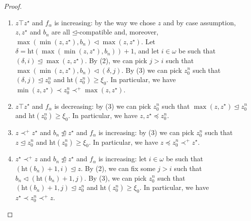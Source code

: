 \documentclass[12pt]{amsart}
\theoremstyle{definition}
\theoremstyle{remark}
\begin{document}
\begin{proof}

\begin{enumerate}[label={(\roman*)}]
\itemsep0.3em
\item $z \top z^\star$ and $f_\alpha$ is increasing:
\newline by the way we chose $z$ and by case assumption, $z,z^\star$ and $b_n$ are all $\unlhd$-compatible and, moreover, $\max(\min(z,z^\star), b_n) \lhd \max(z,z^\star)$. Let $\delta = \mathrm{ht}(\max(\min(z, z^\star), b_n))+1$, and let $i \in \omega$ be such that $(\delta, i) \unlhd \max(z, z^\star)$. By (2), we can pick $j > i$ such that $\max(\min(z, z^\star), b_n) \lhd (\delta, j)$. By (3) we can pick $z_0^n$ such that $(\delta, j) \unlhd z_0^n$ and $\mathrm{ht}(z_0^n) \ge \xi_0$. In particular, we have $\min(z,z^\star) \prec z_0^n \prec^+ \max(z, z^\star)$. 

\item $z \top z^\star$ and $f_\alpha$ is decreasing:
\newline by (3) we can pick $z_0^n$ such that $\max (z,z^\star) \unlhd z_0^n$ and $\mathrm{ht}(z_0^n) \ge \xi_0$. In particular, we have $z,z^\star \preceq z_0^n$.

\item $z \prec^+ z^\star$ and $b_n \not\trianglelefteq z^\star$ and $f_\alpha$ is increasing:
\newline by (3) we can pick $z_0^n$ such that $z \unlhd z_0^n$ and $\mathrm{ht}(z_0^n) \ge \xi_0$. In particular, we have $z \preceq z_0^n \prec^+ z^\star$.


\item $z^\star \prec^+ z$ and $b_n \not\trianglelefteq z^\star$ and $f_\alpha$ is increasing:
\newline let $i \in \omega$ be such that $(\mathrm{ht}(b_n)+1, i) \unlhd z$. By (2), we can fix some $j > i$ such that $b_n \lhd (\mathrm{ht}(b_n)+1, j)$. By (3), we can pick $z_0^n$ such that $(\mathrm{ht}(b_n)+1, j) \unlhd z_0^n$ and $\mathrm{ht}(z_0^n) \ge \xi_0$. In particular, we have $z^\star \prec z_0^n \prec^+ z$.



\end{enumerate}
\end{proof}
\end{document}

